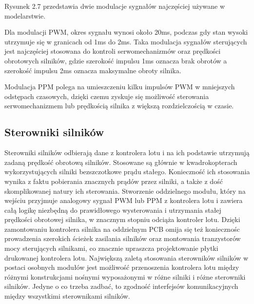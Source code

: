 Rysunek 2.7 przedstawia dwie modulacje sygnałów najczęściej używane w modelarstwie. 

Dla modulacji PWM, okres sygnału wynosi około 20ms, podczas gdy stan wysoki utrzymuje się w granicach od 1ms do 2ms. Taka modulacja sygnałów sterujących jest najczęściej stosowana do kontroli serwomechanizmów oraz prędkości obrotowych silników, gdzie szerokość impulsu 1ms oznacza brak obrotów a szerokość impulsu 2ms oznacza maksymalne obroty silnika. 

Modulacja PPM polega na umieszczeniu kilku impulsów PWM w mniejszych odstępach czasowych, dzięki czemu zyskuje się możliwość sterowania serwomechanizmem lub prędkością silnika z większą rozdzielczością w czasie.


\subsection{Sterowniki silników}

Sterowniki silników odbierają dane z kontrolera lotu i na ich podstawie utrzymują zadaną prędkość obrotową silników. Stosowane są głównie w kwadrokopterach wykorzystujących silniki bezszczotkowe prądu stałego. Konieczność ich stosowania wynika z faktu pobierania znacznych prądów przez silniki, a także z dość skomplikowanej natury ich sterowania. Stworzenie oddzielnego modułu, który na wejściu przyjmuje analogowy sygnał PWM lub PPM z kontrolera lotu i zawiera całą logikę niezbędną do prawidłowego wysterowania i utrzymania stałej prędkości obrotowej silnika, w znacznym stopniu odciąża kontroler lotu. Dzięki zamontowaniu kontrolera silnika na oddzielnym PCB omija się też koniecznośc prowadzenia szerokich ścieżek zasilania silników oraz montowania tranzystorów mocy sterujących silnikami, co znacznie upraszcza projektowanie płytki drukowanej kontrolera lotu. Największą zaletą stosowania sterowników silników w postaci osobnych modułów jest możliwość przenoszenia kontrolera lotu między różnymi konstrukcjami nośnymi wyposażonymi w różne silniki i różne sterowniki silników. Jedyne o co trzeba zadbać, to zgodność interfejsów komunikacyjnych między wszystkimi sterownikami silników. 

